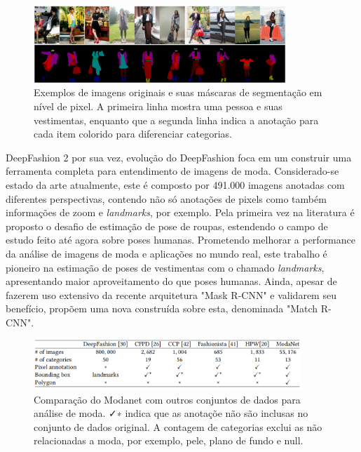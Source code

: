 \documentclass[12pt]{report}
\begin{document}
\begin{figure}
    \centering
    \includegraphics[width=0.85\textwidth]{images/modanet3.png}
    \caption{Exemplos de imagens originais e suas máscaras de segmentação em nível de pixel. A primeira linha mostra uma pessoa e suas vestimentas, enquanto que a segunda linha indica a anotação para cada item colorido para diferenciar categorias.}
    \label{fig:modanet3}
\end{figure}

DeepFashion 2 por sua vez, evolução do DeepFashion foca em um construir uma ferramenta completa para entendimento de imagens de moda. Considerado-se estado da arte atualmente, este é composto por 491.000 imagens anotadas com diferentes perspectivas, contendo não só anotações de pixels como também informações de zoom e \textit{landmarks}, por exemplo. Pela primeira vez na literatura é proposto o desafio de estimação de pose de roupas, estendendo o campo de estudo feito até agora sobre poses humanas. Prometendo melhorar a performance da análise de imagens de moda e aplicações no mundo real, este trabalho é pioneiro na estimação de poses de vestimentas com o chamado \textit{landmarks}, apresentando maior aproveitamento do que poses humanas. Ainda, apesar de fazerem uso extensivo da recente arquitetura "Mask R-CNN" e validarem seu benefício, propõem uma nova construída sobre esta, denominada "Match R-CNN". %



\begin{figure}
    \centering
    \includegraphics[width=0.9\textwidth]{images/modanet2.png}
    \caption{Comparação do Modanet com outros conjuntos de dados para análise de moda. ✓∗ indica que as anotaçõe não são inclusas no conjunto de dados original. A contagem de categorias exclui as não relacionadas a moda, por exemplo, pele, plano de fundo e null.}
    \label{fig:modanet2}
\end{figure}
\end{document}
